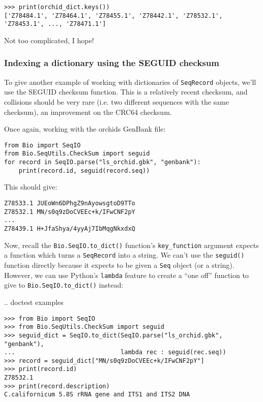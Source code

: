 \begin{verbatim}
>>> print(orchid_dict.keys())
['Z78484.1', 'Z78464.1', 'Z78455.1', 'Z78442.1', 'Z78532.1', 'Z78453.1', ..., 'Z78471.1']
\end{verbatim}

\noindent Not too complicated, I hope!

\subsubsection{Indexing a dictionary using the SEGUID checksum}

To give another example of working with dictionaries of \verb|SeqRecord| objects, we'll use the SEGUID checksum function.  This is a relatively recent checksum, and collisions should be very rare (i.e. two different sequences with the same checksum), an improvement on the CRC64 checksum.

Once again, working with the orchids GenBank file:

\begin{verbatim}
from Bio import SeqIO
from Bio.SeqUtils.CheckSum import seguid
for record in SeqIO.parse("ls_orchid.gbk", "genbank"):
    print(record.id, seguid(record.seq))
\end{verbatim}

\noindent This should give:

\begin{verbatim}
Z78533.1 JUEoWn6DPhgZ9nAyowsgtoD9TTo
Z78532.1 MN/s0q9zDoCVEEc+k/IFwCNF2pY
...
Z78439.1 H+JfaShya/4yyAj7IbMqgNkxdxQ
\end{verbatim}

Now, recall the \verb|Bio.SeqIO.to_dict()| function's \verb|key_function| argument expects a function which turns a \verb|SeqRecord| into a string.  We can't use the \verb|seguid()| function directly because it expects to be given a \verb|Seq| object (or a string).  However, we can use Python's \verb|lambda| feature to create a ``one off'' function to give to \verb|Bio.SeqIO.to_dict()| instead:

\pandocignoreme .. doctest examples
\begin{verbatim}
>>> from Bio import SeqIO
>>> from Bio.SeqUtils.CheckSum import seguid
>>> seguid_dict = SeqIO.to_dict(SeqIO.parse("ls_orchid.gbk", "genbank"),
...                             lambda rec : seguid(rec.seq))
>>> record = seguid_dict["MN/s0q9zDoCVEEc+k/IFwCNF2pY"]
>>> print(record.id)
Z78532.1
>>> print(record.description)
C.californicum 5.8S rRNA gene and ITS1 and ITS2 DNA
\end{verbatim}

